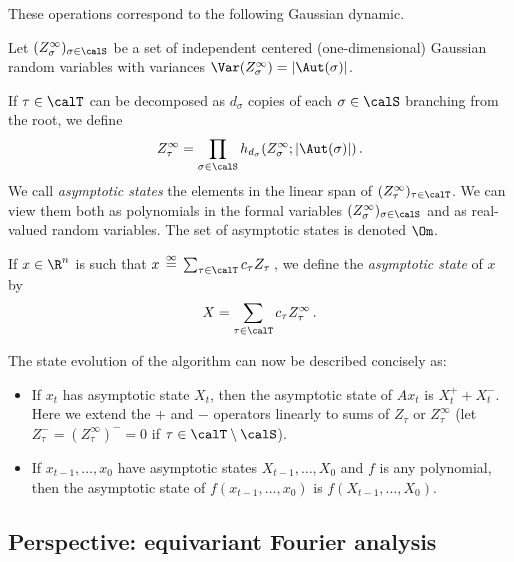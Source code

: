 \documentclass[12pt]{article}
\newcommand{\eqinf}{\,\overset{\infty}{=}\,}
\begin{document}
These operations correspond to the following Gaussian dynamic.

\begin{definition}
    Let $(Z_\sigma^\infty)_{\sigma\in\calS}$ be a
    set of independent centered (one-dimensional)
    Gaussian random
    variables with variances $\Var(Z_\sigma^\infty)=\left|\Aut(\sigma)\right|$.

    If $\tau\in\calT$ can be decomposed as $d_\sigma$ copies of each
    $\sigma\in\calS$ branching from the root, we define 
    \[
        Z_\tau^\infty=\prod_{\sigma\in\calS} h_{d_\sigma}(Z^\infty_\sigma;\left|\Aut(\sigma)\right|)\,.
    \]
    We call {\em asymptotic states}
    the elements in the linear span of $(Z^\infty_\tau)_{\tau\in\calT}$. We can view them both as polynomials in the formal
    variables $(Z_\sigma^\infty)_{\sigma\in\calS}$ and
    as real-valued random variables.
    The set of asymptotic states is denoted $\Om$.
\end{definition}


\begin{definition}\label{def:asymptotic-state}
    If $x\in\R^n$ is such that $x\eqinf \sum_{\tau\in\calT} c_\tau Z_\tau\,$, we
    define the {\em asymptotic state} of $x$ by
    \[
        X = \sum_{\tau\in\calT} c_\tau Z_\tau^\infty\,.
    \]

\end{definition}

The state evolution of the algorithm can now be described concisely as:\begin{itemize}
    \item If $x_t$ has asymptotic state $X_t$, then the asymptotic state of $Ax_t$ is $X_t^+ + X_t^-$.
    Here we extend the $+$ and $-$ operators linearly to sums of
    $Z_\tau$ or $Z^\infty_\tau$
    (let $Z_\tau^- = (Z^\infty_\tau)^- = 0$ if $\tau \in \calT \setminus \calS$).

    \item If $x_{t-1}, \ldots, x_0$ have asymptotic
    states $X_{t-1}, \ldots, X_0$ and $f$ is any polynomial, then the asymptotic state of $f(x_{t-1},\ldots,x_0)$ is $f(X_{t-1},\ldots,X_0)$.
\end{itemize}
 


\subsection{Perspective: equivariant Fourier analysis}
\label{sec:sym-Fourier-analysis}
\end{document}
